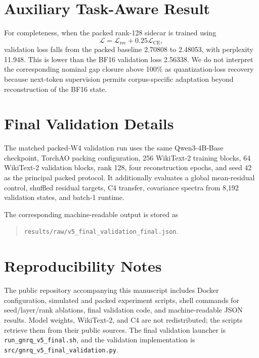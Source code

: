 \documentclass[11pt]{article}
\begin{document}
\appendix

\section{Auxiliary Task-Aware Result}

For completeness, when the packed rank-128 sidecar is trained using
\begin{equation}
 \mathcal{L}=\mathcal{L}_{\mathrm{rec}}+0.25\mathcal{L}_{\mathrm{CE}},
\end{equation}
validation loss falls from the packed baseline 2.70808 to 2.48053, with perplexity 11.948. This is lower than the BF16 validation loss 2.56338. We do not interpret the corresponding nominal gap closure above 100\% as quantization-loss recovery because next-token supervision permits corpus-specific adaptation beyond reconstruction of the BF16 state.

\section{Final Validation Details}

The matched packed-W4 validation run uses the same Qwen3-4B-Base checkpoint, TorchAO packing configuration, 256 WikiText-2 training blocks, 64 WikiText-2 validation blocks, rank 128, four reconstruction epochs, and seed 42 as the principal packed protocol. It additionally evaluates a global mean-residual control, shuffled residual targets, C4 transfer, covariance spectra from 8,192 validation states, and batch-1 runtime.

The corresponding machine-readable output is stored as
\begin{quote}
\texttt{results/raw/v5\_final\_validation\_final.json}.
\end{quote}

\section{Reproducibility Notes}

The public repository accompanying this manuscript includes Docker configuration, simulated and packed experiment scripts, shell commands for seed/layer/rank ablations, final validation code, and machine-readable JSON results. Model weights, WikiText-2, and C4 are not redistributed; the scripts retrieve them from their public sources. The final validation launcher is \texttt{run\_gnrq\_v5\_final.sh}, and the validation implementation is \texttt{src/gnrq\_v5\_final\_validation.py}.
\end{document}
